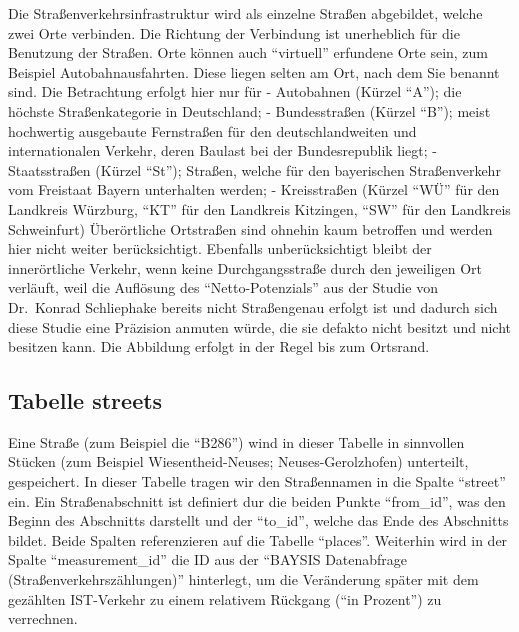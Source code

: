 \documentclass[fontsize=12pt,a4paper]{scrreprt}
\begin{document}
Die Straßenverkehrsinfrastruktur wird als einzelne Straßen abgebildet, welche zwei Orte verbinden. Die Richtung der Verbindung ist unerheblich für die Benutzung der Straßen. Orte können auch \enquote{virtuell} erfundene Orte sein, zum Beispiel Autobahnausfahrten. Diese liegen selten am Ort, nach dem Sie benannt sind.\newline
\newline
Die Betrachtung erfolgt hier nur für\newline
- Autobahnen (Kürzel \enquote{A}); die höchste Straßenkategorie in Deutschland;\newline
- Bundesstraßen (Kürzel \enquote{B}); meist hochwertig ausgebaute Fernstraßen für den deutschlandweiten und internationalen Verkehr, deren Baulast bei der Bundesrepublik liegt;\newline
- Staatsstraßen (Kürzel \enquote{St}); Straßen, welche für den bayerischen Straßenverkehr vom Freistaat Bayern unterhalten werden;\newline
- Kreisstraßen (Kürzel \enquote{WÜ} für den Landkreis Würzburg, \enquote{KT} für den Landkreis Kitzingen, \enquote{SW} für den Landkreis Schweinfurt)\newline
\newline
Überörtliche Ortstraßen sind ohnehin kaum betroffen und werden hier nicht weiter berücksichtigt.\newline
\newline
Ebenfalls unberücksichtigt bleibt der innerörtliche Verkehr, wenn keine Durchgangsstraße durch den jeweiligen Ort verläuft, weil die Auflösung des \enquote{Netto-Potenzials} aus der Studie von Dr.\ Konrad Schliephake bereits nicht Straßengenau erfolgt ist und dadurch sich diese Studie eine Präzision anmuten würde, die sie defakto nicht besitzt und nicht besitzen kann. Die Abbildung erfolgt in der Regel bis zum Ortsrand.

\subsection{Tabelle streets}

Eine Straße (zum Beispiel die \enquote{B286}) wind in dieser Tabelle in sinnvollen Stücken (zum Beispiel Wiesentheid-Neuses; Neuses-Gerolzhofen) unterteilt, gespeichert. In dieser Tabelle tragen wir den Straßennamen in die Spalte \enquote{street} ein. Ein Straßenabschnitt ist definiert dur die beiden Punkte \enquote{from_id}, was den Beginn des Abschnitts darstellt und der \enquote{to_id}, welche das Ende des Abschnitts bildet. Beide Spalten referenzieren auf die Tabelle \enquote{places}. Weiterhin wird in der Spalte \enquote{measurement_id} die ID aus der \enquote{BAYSIS Datenabfrage (Straßenverkehrszählungen)} hinterlegt, um die Veränderung später mit dem gezählten IST-Verkehr zu einem relativem Rückgang (\enquote{in Prozent}) zu verrechnen.
\end{document}
